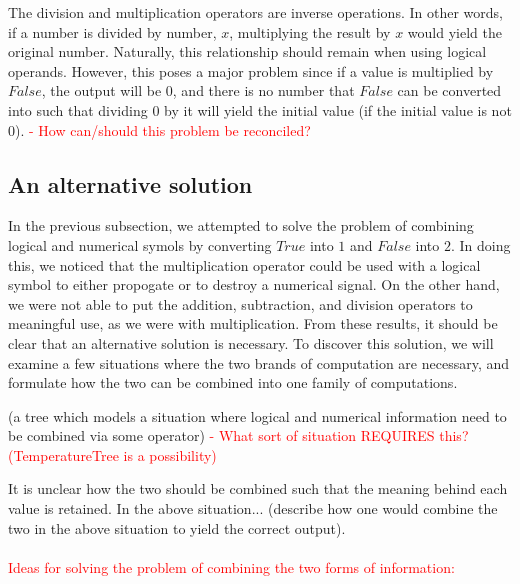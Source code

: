\documentclass{article}
\begin{document}
	The division and multiplication operators are inverse operations. In other words, if a number is divided by number, $x$, multiplying the result by $x$ would yield the original number. Naturally, this relationship should remain when using logical operands. However, this poses a major problem since if a value is multiplied by $False$, the output will be $0$, and there is no number that $False$ can be converted into such that dividing $0$ by it will yield the initial value (if the initial value is not $0$).
	\textcolor{red}{- How can/should this problem be reconciled?} \\
	
	\subsection{An alternative solution}
	
	In the previous subsection, we attempted to solve the problem of combining logical and numerical symols by converting $True$ into $1$ and $False$ into $2$. In doing this, we noticed that the multiplication operator could be used with a logical symbol to either propogate or to destroy a numerical signal. On the other hand, we were not able to put the addition, subtraction, and division operators to meaningful use, as we were with multiplication. From these results, it should be clear that an alternative solution is necessary. To discover this solution, we will examine a few situations where the two brands of computation are necessary, and formulate how the two can be combined into one family of computations. 
	
	(a tree which models a situation where logical and numerical information need to be combined via some operator) \textcolor{red}{- What sort of situation REQUIRES this? (TemperatureTree is a possibility)}
	
	It is unclear how the two should be combined such that the meaning behind each value is retained. In the above situation... (describe how one would combine the two in the above situation to yield the correct output). \\ \\
	
	\textcolor{red}{Ideas for solving the problem of combining the two forms of information:}
	
\end{document}
